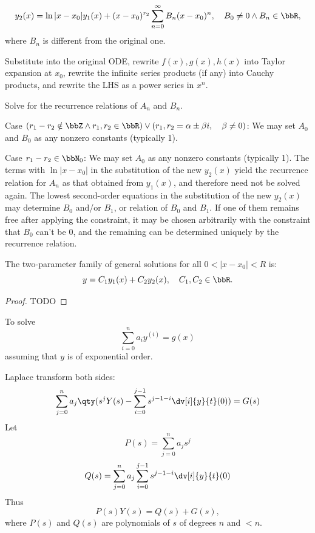 \documentclass[a4paper,12pt]{report}
\begin{document}
\[y_2(x)=\ln|x-x_0|y_1(x)+(x-x_0)^{r_2}\sum_{n=0}^{\infty}B_n(x-x_0)^n,\quad B_0\neq 0\land B_n\in\bbR,\]
where $B_n$ is different from the original one.
\eit 
\item Substitute into the original ODE, rewrite $f(x),g(x),h(x)$ into Taylor expansion at $x_0$, rewrite the infinite series products (if any) into Cauchy products, and rewrite the LHS as a power series in $x^n$.
\item Solve for the recurrence relations of $A_n$ and $B_n$.
\bit
\item Case $(r_1-r_2\notin\bbZ\land r_1,r_2\in\bbR)\lor (r_1,r_2=\alpha\pm\beta i,\quad\beta\ne0)$: We may set $A_0$ and $B_0$ as any nonzero constants (typically 1).
\item Case $r_1-r_2\in\bbN_0$: We may set $A_0$ as any nonzero constants (typically 1). The terms with $\ln|x-x_0|$ in the substitution of the new $y_2(x)$ yield the recurrence relation for $A_n$ as that obtained from $y_1(x)$, and therefore need not be solved again. The lowest second-order equations in the substitution of the new $y_2(x)$ may determine $B_0$ and/or $B_1$, or relation of $B_0$ and $B_1$. If one of them remains free after applying the constraint, it may be chosen arbitrarily with the constraint that $B_0$ can't be 0, and the remaining can be determined uniquely by the recurrence relation.
\eit
\item The two-parameter family of general solutions for all $0<|x-x_0|<R$ is:
\[y=C_1y_1(x)+C_2y_2(x),\quad C_1,C_2\in\bbR.\]
\een
\begin{proof}
TODO
\end{proof}
To solve
\[\sum_{i=0}^na_iy^{(i)}=g(x)\]
assuming that $y$ is of exponential order.

Laplace transform both sides:
\[\sum_{j=0}^na_j\qty(s^jY(s)-\sum_{i=0}^{j-1}s^{j-1-i}\dv[i]{y}{t}(0))=G(s)\]
Let
\[P(s)=\sum_{j=0}^na_js^j\]
\[Q(s)=\sum_{j=0}^na_j\sum_{i=0}^{j-1}s^{j-1-i}\dv[i]{y}{t}(0)\]
Thus
\[P(s)Y(s)=Q(s)+G(s),\]
where \(P(s)\) and \(Q(s)\) are polynomials of $s$ of degrees $n$ and $<n$.
\end{document}
